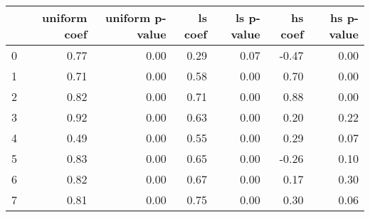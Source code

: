 \begin{tabular}{lrrrrrr}
\toprule
 & uniform coef & uniform p-value & ls coef & ls p-value & hs coef & hs p-value \\
\midrule
0 & 0.77 & 0.00 & 0.29 & 0.07 & -0.47 & 0.00 \\
1 & 0.71 & 0.00 & 0.58 & 0.00 & 0.70 & 0.00 \\
2 & 0.82 & 0.00 & 0.71 & 0.00 & 0.88 & 0.00 \\
3 & 0.92 & 0.00 & 0.63 & 0.00 & 0.20 & 0.22 \\
4 & 0.49 & 0.00 & 0.55 & 0.00 & 0.29 & 0.07 \\
5 & 0.83 & 0.00 & 0.65 & 0.00 & -0.26 & 0.10 \\
6 & 0.82 & 0.00 & 0.67 & 0.00 & 0.17 & 0.30 \\
7 & 0.81 & 0.00 & 0.75 & 0.00 & 0.30 & 0.06 \\
\bottomrule
\end{tabular}
